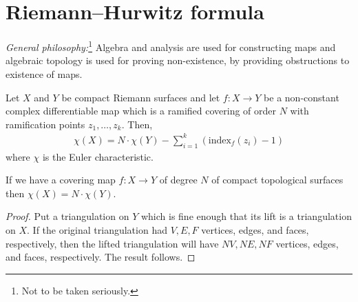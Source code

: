 \documentclass{article}
\begin{document}
\section{Riemann–Hurwitz formula}

\emph{General philosophy:}\footnote{Not to be taken seriously.} Algebra and analysis are used for constructing maps and algebraic topology is used for proving non-existence, by providing obstructions to existence of maps.


\begin{theorem}
  \label{thm:RiemannHurwitz}
  Let $X$ and $Y$ be compact Riemann surfaces and let $f:X \rightarrow Y$ be a non-constant complex differentiable map which is a ramified covering of order $N$ with ramification points $z_1, \dots, z_k$. Then,
  \begin{align*}
    \chi (X)=N\cdot \chi (Y)-\sum_{i = 1}^k\left(\mathrm{index}_f(z_i) - 1\right)
  \end{align*}
  where $\chi$ is the Euler characteristic.
\end{theorem}

  \begin{lemma}
      If we have a covering map $f:X \rightarrow Y$ of degree $N$ of compact topological surfaces then $\chi(X) = N \cdot \chi(Y)$.
  \end{lemma}

  \begin{proof}
    Put a triangulation on $Y$ which is fine enough that its lift is a triangulation on $X$.
    If the original triangulation had $V, E, F$ vertices, edges, and faces, respectively, then the lifted triangulation will have $N V, NE, NF$ vertices, edges, and faces, respectively.
    The result follows.
  \end{proof}
\end{document}
